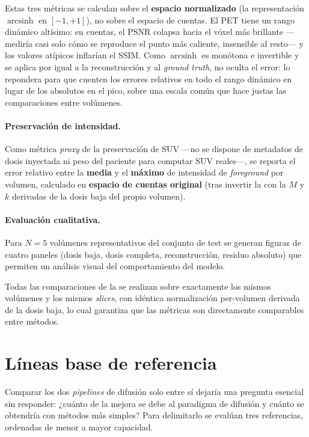 Estas tres métricas se calculan sobre el \textbf{espacio normalizado}
(la representación $\operatorname{arcsinh}$ en $[-1, +1]$), no sobre el
espacio de cuentas. El PET tiene un rango dinámico altísimo: en cuentas,
el PSNR colapsa hacia el vóxel más brillante ---mediría casi solo cómo se
reproduce el punto más caliente, insensible al resto--- y los valores
atípicos inflarían el SSIM. Como $\operatorname{arcsinh}$ es monótona e
invertible y se aplica por igual a la reconstrucción y al \textit{ground
truth}, no oculta el error: lo repondera para que cuenten los errores
relativos en todo el rango dinámico en lugar de los absolutos en el pico,
sobre una escala común que hace justas las comparaciones entre
volúmenes.

\paragraph{Preservación de intensidad.}
Como métrica \textit{proxy} de la preservación de SUV —no se
dispone de metadatos de dosis inyectada ni peso del paciente para
computar SUV reales—, se reporta el error relativo entre la
\textbf{media} y el \textbf{máximo} de intensidad de
\textit{foreground} por volumen, calculado en \textbf{espacio
de cuentas original} (tras invertir la  con la
$M$ y $k$ derivadas de la dosis baja del propio volumen).

\paragraph{Evaluación cualitativa.}
Para $N = 5$ volúmenes representativos del conjunto de test se
generan figuras de cuatro paneles (dosis baja, dosis completa,
reconstrucción, residuo absoluto) que permiten un análisis visual
del comportamiento del modelo.

Todas las comparaciones de la  se realizan
sobre exactamente los mismos volúmenes y los mismos
\textit{slices}, con idéntica normalización per-volumen derivada de
la dosis baja, lo cual garantiza que las métricas son directamente
comparables entre métodos.

\section{Líneas base de referencia}
\label{sec:pet-baselines}

Comparar los dos \textit{pipelines} de difusión solo entre sí
dejaría una pregunta esencial sin responder: ¿cuánto de la mejora se
debe al paradigma de difusión y cuánto se obtendría con métodos más
simples? Para delimitarlo se evalúan tres referencias, ordenadas de
menor a mayor capacidad.

